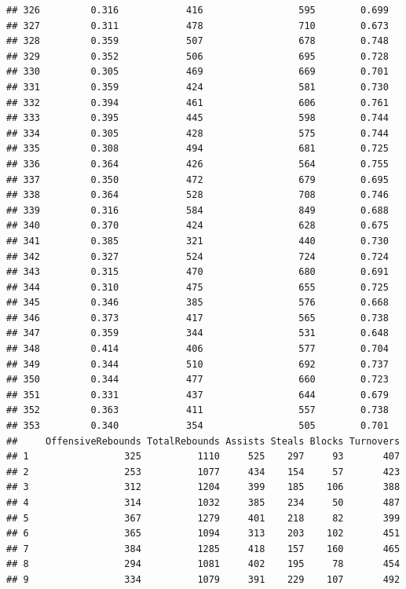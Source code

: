 \documentclass[]{book}
\begin{document}
\begin{verbatim}
## 326         0.316            416                 595        0.699
## 327         0.311            478                 710        0.673
## 328         0.359            507                 678        0.748
## 329         0.352            506                 695        0.728
## 330         0.305            469                 669        0.701
## 331         0.359            424                 581        0.730
## 332         0.394            461                 606        0.761
## 333         0.395            445                 598        0.744
## 334         0.305            428                 575        0.744
## 335         0.308            494                 681        0.725
## 336         0.364            426                 564        0.755
## 337         0.350            472                 679        0.695
## 338         0.364            528                 708        0.746
## 339         0.316            584                 849        0.688
## 340         0.370            424                 628        0.675
## 341         0.385            321                 440        0.730
## 342         0.327            524                 724        0.724
## 343         0.315            470                 680        0.691
## 344         0.310            475                 655        0.725
## 345         0.346            385                 576        0.668
## 346         0.373            417                 565        0.738
## 347         0.359            344                 531        0.648
## 348         0.414            406                 577        0.704
## 349         0.344            510                 692        0.737
## 350         0.344            477                 660        0.723
## 351         0.331            437                 644        0.679
## 352         0.363            411                 557        0.738
## 353         0.340            354                 505        0.701
##     OffensiveRebounds TotalRebounds Assists Steals Blocks Turnovers
## 1                 325          1110     525    297     93       407
## 2                 253          1077     434    154     57       423
## 3                 312          1204     399    185    106       388
## 4                 314          1032     385    234     50       487
## 5                 367          1279     401    218     82       399
## 6                 365          1094     313    203    102       451
## 7                 384          1285     418    157    160       465
## 8                 294          1081     402    195     78       454
## 9                 334          1079     391    229    107       492

\end{verbatim}
\end{document}
